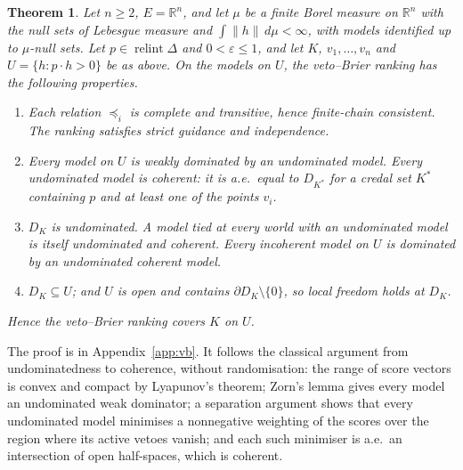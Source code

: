 \documentclass[11pt]{article}
\newcommand{\R}{\mathbb{R}}
\DeclareMathOperator{\relint}{relint}
\theoremstyle{plain}
\newtheorem{theorem}{Theorem}[section]
\theoremstyle{definition}
\theoremstyle{remark}
\begin{document}
\begin{theorem}\label{thm:vb}
Let $n\ge2$, $E=\R^n$, and let $\mu$ be a finite Borel measure on $\R^n$ with the null sets of
Lebesgue measure and $\int\|h\|\,d\mu<\infty$, with models identified up to $\mu$-null sets.
Let $p\in\relint\Delta$ and $0<\varepsilon\le1$, and let $K$, $v_1,\dots,v_n$ and $U=\{h:p\cdot
h>0\}$ be as above. On the models on $U$, the veto--Brier ranking has the following
properties.
\begin{enumerate}[label=(\alph*)]
  \item Each relation $\preceq_i$ is complete and transitive, hence finite-chain consistent. The ranking
  satisfies strict guidance and independence.
  \item Every model on $U$ is weakly dominated by an undominated model. Every undominated model
  is coherent: it is a.e.\ equal to $D_{K^\ast}$ for a credal set $K^\ast$ containing $p$ and at
  least one of the points $v_i$.
  \item $D_K$ is undominated. A model tied at every world with an undominated model is itself
  undominated and coherent. Every incoherent model on $U$ is dominated by an undominated coherent
  model.
  \item $D_K\subseteq U$; and $U$ is open and contains $\partial D_K\setminus\{0\}$, so local
  freedom holds at $D_K$.
\end{enumerate}
Hence the veto--Brier ranking covers $K$ on $U$.
\end{theorem}

The proof is in Appendix~\ref{app:vb}. It follows the classical argument from undominatedness
to coherence, without randomisation: the range of score vectors is convex and compact by Lyapunov's
theorem; Zorn's lemma gives every model an undominated weak dominator; a separation argument
shows that every undominated model minimises a nonnegative weighting of the scores over the
region where its active vetoes vanish; and each such minimiser is a.e.\ an intersection of open
half-spaces, which is coherent.
\end{document}
